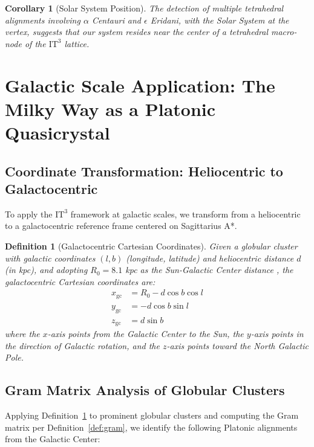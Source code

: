 \documentclass[12pt,a4paper,oneside]{article}
\newtheorem{corollary}[theorem]{Corollary}
\newtheorem{definition}[theorem]{Definition}
\newcommand{\ITthree}{\text{IT}^3}
\begin{document}
\begin{corollary}[Solar System Position]
The detection of multiple tetrahedral alignments involving $\alpha$ Centauri and $\epsilon$ Eridani, with the Solar System at the vertex, suggests that our system resides near the center of a tetrahedral macro-node of the $\ITthree$ lattice.
\end{corollary}

\section{Galactic Scale Application: The Milky Way as a Platonic Quasicrystal}

\subsection{Coordinate Transformation: Heliocentric to Galactocentric}

To apply the $\ITthree$ framework at galactic scales, we transform from a heliocentric to a galactocentric reference frame centered on Sagittarius A*.

\begin{definition}[Galactocentric Cartesian Coordinates]
\label{def:galactic}
Given a globular cluster with galactic coordinates $(l, b)$ (longitude, latitude) and heliocentric distance $d$ (in kpc), and adopting $R_0 = 8.1$ kpc as the Sun-Galactic Center distance \cite{Gravity2020}, the galactocentric Cartesian coordinates are:
\begin{align}
    x_{\text{gc}} &= R_0 - d \cos b \cos l \\
    y_{\text{gc}} &= -d \cos b \sin l \\
    z_{\text{gc}} &= d \sin b
\end{align}
where the $x$-axis points from the Galactic Center to the Sun, the $y$-axis points in the direction of Galactic rotation, and the $z$-axis points toward the North Galactic Pole.
\end{definition}

\subsection{Gram Matrix Analysis of Globular Clusters}

Applying Definition~\ref{def:galactic} to prominent globular clusters and computing the Gram matrix per Definition~\ref{def:gram}, we identify the following Platonic alignments from the Galactic Center:
\end{document}
